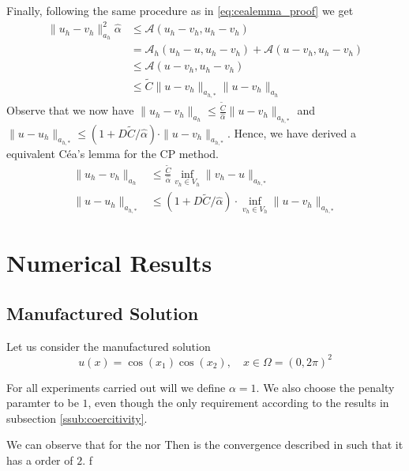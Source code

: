 Finally, following the same procedure as in \eqref{eq:cealemma_proof} we get
\[
    \begin{split}
\| u_{h} - v_{h} \|_{a_{h}  }^{2  } \hat{\alpha } & \le  \mathcal{A} \left( u_{h} - v_{h}, u_{h} - v_{h} \right) \\
& =  \mathcal{A} _{h} \left( u_{h} -u, u_{h} -v_{h} \right) + \mathcal{A} \left( u - v_{h}, u_{h} - v_{h} \right) \\
 &  \le  \mathcal{A}  \left( u - v_{h}, u_{h} - v_{h} \right)   \\
 &\le  \widetilde{C} \| u - v_{h} \|_{ a_{h,*} }^{  } \| u- v_{h} \|_{ a_{h} }^{  }
    \end{split}
\]
Observe that we now have $ \| u_{h} - v_{h} \|_{ a_{h} }^{  }   \le \frac{\widetilde{C}}{\hat{\alpha }}  \| u - v_{h} \|_{ a_{h, *} }^{  }$ and $\| u - u_{h} \|_{ a_{h,*} }^{  }   \le \left( 1 + D \widetilde{C} /\hat{\alpha } \right)\cdot  \| u - v_{h} \|_{ a_{h,*} }^{  } $. Hence, we have derived a equivalent Céa's lemma for the CP method.
\[
    \begin{split}
\| u_{h} - v_{h} \|_{ a_{h} }^{  }  & \le \frac{\widetilde{C}}{\hat{\alpha }}  \inf_{v_{h} \in  V_{h}} \|  v_{h} - u \|_{ a_{h, *} }^{  } \\
\| u - u_{h} \|_{ a_{h,*} }^{  }  & \le \left( 1 + D \widetilde{C} /\hat{\alpha } \right)\cdot \inf_{v_{h} \in  V_{h}}   \| u - v_{h} \|_{ a_{h,*} }^{  }
    \end{split}
\]


\newpage
\section{Numerical Results}%
\label{sec:numerical_results}

\subsection{Manufactured Solution}%
\label{sub:manufactured_solution}

Let us consider the manufactured solution
\[
u\left( x \right) = \cos(x_{1}) \cos \left( x_{2} \right), \quad   x \in \Omega =  \left( 0,2 \pi  \right)^{2}
\]

For all experiments carried out will we define $\alpha  = 1 $. We also choose the penalty paramter to be $1$, even though the only requirement according to the results in subsection \ref{ssub:coercitivity}.

We can observe that for the nor
Then is the convergence described in  such that it has a order of $2$.
f

